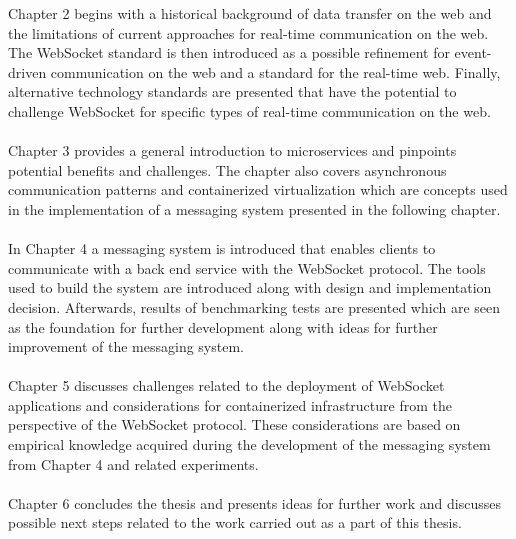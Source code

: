 Chapter 2 begins with a historical background of data transfer on the web and the limitations of current approaches for real-time communication on the web. The WebSocket standard is then introduced as a possible refinement for event-driven communication on the web and a standard for the real-time web. Finally, alternative technology standards are presented that have the potential to challenge WebSocket for specific types of real-time communication on the web.
\\ \\
Chapter 3 provides a general introduction to microservices and pinpoints potential benefits and challenges. The chapter also covers asynchronous communication patterns and containerized virtualization which are concepts used in the implementation of a messaging system presented in the following chapter.
\\ \\
In Chapter 4 a messaging system is introduced that enables clients to communicate with a back end service with the WebSocket protocol. The tools used to build the system are introduced along with design and implementation decision. Afterwards, results of benchmarking tests are presented which are seen as the foundation for further development along with ideas for further improvement of the messaging system.
\\ \\
Chapter 5 discusses challenges related to the deployment of WebSocket applications and considerations for containerized infrastructure from the perspective of the WebSocket protocol. These considerations are based on empirical knowledge acquired during the development of the messaging system from Chapter 4 and related experiments.
\\ \\
Chapter 6 concludes the thesis and presents ideas for further work and discusses possible next steps related to the work carried out as a part of this thesis.